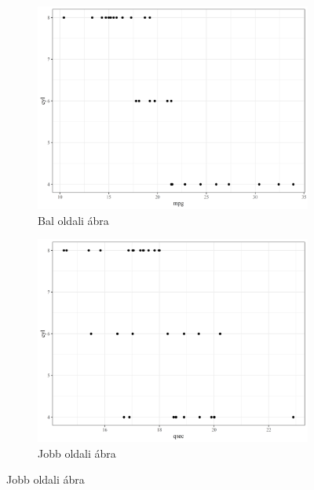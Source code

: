 \documentclass[]{elsarticle} %
\begin{document}
\begin{figure}[h]
\begin{multicols}{2}
\begin{figure}[H]
\includegraphics[width = \linewidth]{cookbook_files/figure-latex/cyl-fig1-1}
\caption{Bal oldali ábra}
\label{fig:bar2_a2}
\end{figure}

\columnbreak

\begin{figure}[H]
\includegraphics[width = \linewidth]{cookbook_files/figure-latex/cyl-fig1-2}
\centering
\caption{Jobb oldali ábra}
\label{fig:bar2_b2}
\end{figure}
\end{multicols}
\end{figure}
\end{document}
